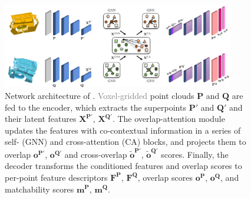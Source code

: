 \begin{figure}[t]
    \centering
    \includegraphics[width=0.9\textwidth]{figures/images/network_architecture.pdf}
    \caption{Network architecture of \acro. \textcolor{gray}{Voxel-gridded} point clouds $\mathbf{P}$ and $\mathbf{Q}$ are fed to the encoder, which extracts the superpoints $\mathbf{P}'$ and $\mathbf{Q}'$ and their latent features $\mathbf{X}^{\mathbf{P}'}$, $\mathbf{X}^{\mathbf{Q}'}$. The overlap-attention module updates the features with co-contextual information in a series of self- (GNN) and cross-attention (CA) blocks, and projects them to overlap  $\mathbf{o}^{\mathbf{P}'}$, $\mathbf{o}^{\mathbf{Q}'}$ and cross-overlap $\tilde{\mathbf{o}}^{\mathbf{P}'}$, $\tilde{\mathbf{o}}^{\mathbf{Q}'}$ scores. Finally, the decoder transforms the conditioned features and overlap scores to per-point feature descriptors $\mathbf{F}^\mathbf{P}$, $\mathbf{F}^\mathbf{Q}$, overlap scores $\mathbf{o}^\mathbf{P}$, $\mathbf{o}^\mathbf{Q}$, and matchability scores $\mathbf{m}^\mathbf{P}$, $\mathbf{m}^\mathbf{Q}$.}
    \label{fig:network_arch}
    
\end{figure}
